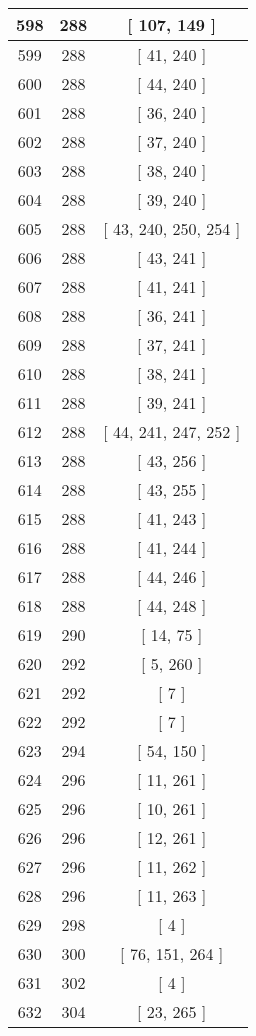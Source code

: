 \begin{center}
\begin{longtable}[H]{|| c c c ||}
\hline
598 & 288 & [ 107, 149 ] \\ 
\hline
599 & 288 & [ 41, 240 ] \\ 
\hline
600 & 288 & [ 44, 240 ] \\ 
\hline
601 & 288 & [ 36, 240 ] \\ 
\hline
602 & 288 & [ 37, 240 ] \\ 
\hline
603 & 288 & [ 38, 240 ] \\ 
\hline
604 & 288 & [ 39, 240 ] \\ 
\hline
605 & 288 & [ 43, 240, 250, 254 ] \\ 
\hline
606 & 288 & [ 43, 241 ] \\ 
\hline
607 & 288 & [ 41, 241 ] \\ 
\hline
608 & 288 & [ 36, 241 ] \\ 
\hline
609 & 288 & [ 37, 241 ] \\ 
\hline
610 & 288 & [ 38, 241 ] \\ 
\hline
611 & 288 & [ 39, 241 ] \\ 
\hline
612 & 288 & [ 44, 241, 247, 252 ] \\ 
\hline
613 & 288 & [ 43, 256 ] \\ 
\hline
614 & 288 & [ 43, 255 ] \\ 
\hline
615 & 288 & [ 41, 243 ] \\ 
\hline
616 & 288 & [ 41, 244 ] \\ 
\hline
617 & 288 & [ 44, 246 ] \\ 
\hline
618 & 288 & [ 44, 248 ] \\ 
\hline
619 & 290 & [ 14, 75 ] \\ 
\hline
620 & 292 & [ 5, 260 ] \\ 
\hline
621 & 292 & [ 7 ] \\ 
\hline
622 & 292 & [ 7 ] \\ 
\hline
623 & 294 & [ 54, 150 ] \\ 
\hline
624 & 296 & [ 11, 261 ] \\ 
\hline
625 & 296 & [ 10, 261 ] \\ 
\hline
626 & 296 & [ 12, 261 ] \\ 
\hline
627 & 296 & [ 11, 262 ] \\ 
\hline
628 & 296 & [ 11, 263 ] \\ 
\hline
629 & 298 & [ 4 ] \\ 
\hline
630 & 300 & [ 76, 151, 264 ] \\ 
\hline
631 & 302 & [ 4 ] \\ 
\hline
632 & 304 & [ 23, 265 ] \\ 

\end{longtable}
\end{center}
